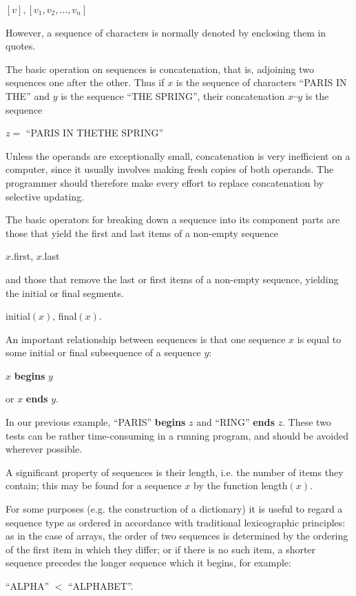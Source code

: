 \documentclass[twoside,11pt]{book}
\let\wideparen\overparen
\begin{document}
\quad $[v],$\qquad $[v_1, v_2, \dots, v_n]$

\noindent
However, a sequence of characters is normally denoted by enclosing them in quotes.

The basic operation on sequences is concatenation, that is, adjoining two sequences one after the other. Thus if $x$ is the sequence of characters ``PARIS IN THE'' and $y$ is the sequence ``THE SPRING'', their concatenation $x\wideparen{\ \ }y$ is the sequence

\quad $z =$ ``PARIS IN THETHE SPRING''

\noindent
Unless the operands are exceptionally small, concatenation is very inefficient on a computer, since it usually involves making fresh copies of both operands. The programmer should therefore make every effort to replace concatenation by selective updating.

The basic operators for breaking down a sequence into its component parts are those that yield the first and last items of a non-empty sequence

\quad $x$.first, $x$.last

\noindent
and those that remove the last or first items of a non-empty sequence, yielding the initial or final segments.

\quad initial$(x)$, final$(x)$.

An important relationship between sequences is that one sequence $x$ is equal to some initial or final subsequence of a sequence $y$:

\quad $x$ \textbf{begins} $y$

\quad or $x$ \textbf{ends} $y$.

\noindent
In our previous example, ``PARIS'' \textbf{begins} $z$ and ``RING'' \textbf{ends} $z$. These two tests can be rather time-consuming in a running program, and should be avoided wherever possible.

A significant property of sequences is their length, i.e. the number of items they contain; this may be found for a sequence $x$ by the function length$(x)$.

For some purposes (e.g. the construction of a dictionary) it is useful to regard a sequence type as ordered in accordance with traditional lexicographic principles: as in the case of arrays, the order of two sequences is determined by the ordering of the first item in which they differ; or if there is no such item, a shorter sequence precedes the longer sequence which it begins, for example:

\quad ``ALPHA'' $<$ ``ALPHABET''.
\end{document}
